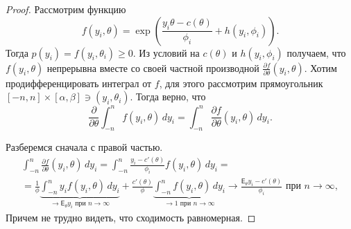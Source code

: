 \begin{proof}
  Рассмотрим функцию
  $$
    f(y_i, \theta) = \exp\left(
    \frac{y_i\theta - c(\theta)}{\phi_i} + h(y_i, \phi_i)\right).
  $$
  Тогда $p(y_i) = f(y_i, \theta_i) \geq 0$. Из условий на $c(\theta)$ и $h(y_i, \phi_i)$ получаем, что $f(y_i, \theta)$ непрерывна вместе со своей частной производной $\frac{\partial f}{\partial \theta}(y_i, \theta)$. Хотим продифференцировать интеграл от $f$, для этого рассмотрим прямоугольник $[-n, n]\times[\alpha, \beta] \ni (y_i, \theta_i)$. Тогда верно, что
  $$
    \frac{\partial}{\partial\theta} \int_{-n}^n f(y_i, \theta)\,dy_i = \int_{-n}^n\frac{\partial f}{\partial\theta}(y_i,\theta)\,dy_i.
  $$
  
  Разберемся сначала с правой частью.
  \begin{multline*}
    \int_{-n}^n\frac{\partial f}{\partial\theta}(y_i,\theta)\,dy_i =
    \int_{-n}^n\frac{y_i - c'(\theta)}{\phi_i} f(y_i, \theta)\,dy_i =\\=
    \frac{1}{\phi}
    \underbrace{
      \int_{-n}^n y_if(y_i, \theta)\,dy_i
    }_{\to\mathsf{E}_\theta y_i \text{ при } n\to\infty} +
    \frac{c'(\theta)}{\phi}
    \underbrace{
      \int_{-n}^n f(y_i, \theta)\,dy_i
    }_{\to 1 \text{ при } n\to\infty}\to
    \frac{\mathsf{E}_\theta y_i - c'(\theta)}{\phi_i} \text{ при } n\to\infty,
  \end{multline*}
  Причем не трудно видеть, что сходимость равномерная.
  

\end{proof}

